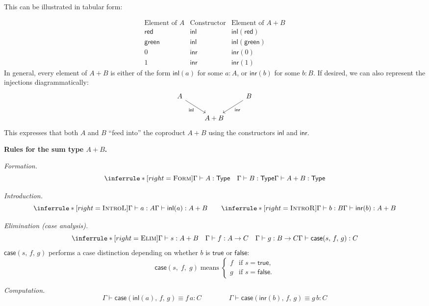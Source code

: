 \documentclass{article}
\newcommand{\Type}{\ensuremath{\mathsf{Type}}}
\newcommand{\inl}{\mathsf{inl}}
\newcommand{\inr}{\mathsf{inr}}
\newcommand{\caseof}{\mathsf{case}}
\newcommand{\judg}[3]{#1 \vdash #2 : #3}   %
\newcommand{\jdeq}{\equiv}                 %
\newcommand{\teq}[4]{#1 \vdash #2 \jdeq #3 : #4} %
\newcommand{\rulename}[1]{\textsc{#1}}
\begin{document}
\bigskip
\noindent
This can be illustrated in tabular form:

\[
\begin{array}{c|c|c}
\text{Element of } A & \text{Constructor} & \text{Element of } A + B \\ \hline
\mathsf{red} & \inl & \inl(\mathsf{red}) \\
\mathsf{green} & \inl & \inl(\mathsf{green}) \\ \hline
0 & \inr & \inr(0) \\
1 & \inr & \inr(1)
\end{array}
\]
In general, every element of \(A + B\) is either of the form
\(\inl(a)\) for some \(a : A\), or \(\inr(b)\) for some \(b : B\). If desired, we can also represent the injections diagrammatically:
\[
\begin{tikzcd}
A \arrow[dr, "\inl"'] & & B \arrow[dl, "\inr"] \\
& A + B &
\end{tikzcd}
\]
This expresses that both \(A\) and \(B\) “feed into” the coproduct \(A + B\) using the constructors $\inl$ and $\inr$.

\medskip
\noindent\textbf{Rules for the sum type \(A + B\).}

\medskip
\noindent
\emph{Formation.}
\[
\inferrule*[right=\rulename{Form}]{
  \judg{\Gamma}{A}{\Type}
  \quad
  \judg{\Gamma}{B}{\Type}
}{
  \judg{\Gamma}{A + B}{\Type}
}
\]

\medskip
\noindent
\emph{Introduction.}
\[
\inferrule*[right=\rulename{IntroL}]{
  \judg{\Gamma}{a}{A}
}{
  \judg{\Gamma}{\inl(a)}{A + B}
}
\qquad
\inferrule*[right=\rulename{IntroR}]{
  \judg{\Gamma}{b}{B}
}{
  \judg{\Gamma}{\inr(b)}{A + B}
}
\]

\medskip
\noindent
\emph{Elimination (case analysis).}
\[
\inferrule*[right=\rulename{Elim}]{
  \judg{\Gamma}{s}{A + B}
  \quad
  \judg{\Gamma}{f}{A \to C}
  \quad
  \judg{\Gamma}{g}{B \to C}
}{
  \judg{\Gamma}{\caseof(s,\,f,\,g)}{C}
}
\]
$\caseof(s,\,f,\,g)$ performs a case distinction depending on whether \(b\) is
\(\mathsf{true}\) or \(\mathsf{false}\):
\[
\caseof(s,\;
  f,\;
  g)
\;\text{means}\;
\begin{cases}
f & \text{if } s = \mathsf{true},\\
g & \text{if } s = \mathsf{false}.
\end{cases}
\]

\medskip
\noindent
\emph{Computation.}
\[
\teq{\Gamma}{\caseof(\inl(a),\,f,\,g)}{f\,a}{C}
\qquad\qquad
\teq{\Gamma}{\caseof(\inr(b),\,f,\,g)}{g\,b}{C}
\]
\end{document}
